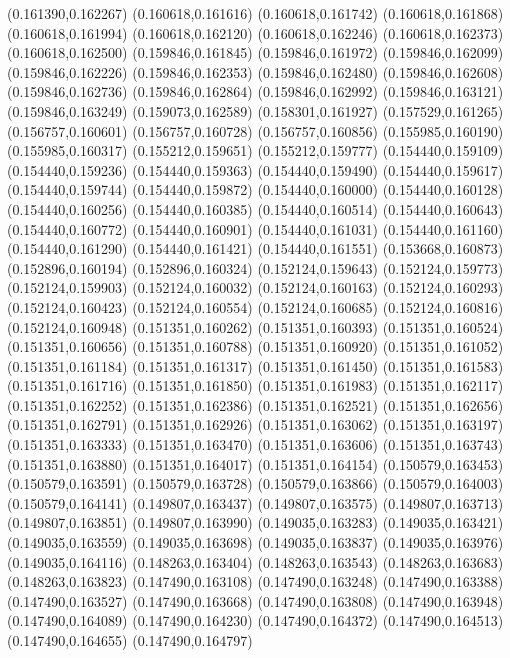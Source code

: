 (0.161390,0.162267)
(0.160618,0.161616)
(0.160618,0.161742)
(0.160618,0.161868)
(0.160618,0.161994)
(0.160618,0.162120)
(0.160618,0.162246)
(0.160618,0.162373)
(0.160618,0.162500)
(0.159846,0.161845)
(0.159846,0.161972)
(0.159846,0.162099)
(0.159846,0.162226)
(0.159846,0.162353)
(0.159846,0.162480)
(0.159846,0.162608)
(0.159846,0.162736)
(0.159846,0.162864)
(0.159846,0.162992)
(0.159846,0.163121)
(0.159846,0.163249)
(0.159073,0.162589)
(0.158301,0.161927)
(0.157529,0.161265)
(0.156757,0.160601)
(0.156757,0.160728)
(0.156757,0.160856)
(0.155985,0.160190)
(0.155985,0.160317)
(0.155212,0.159651)
(0.155212,0.159777)
(0.154440,0.159109)
(0.154440,0.159236)
(0.154440,0.159363)
(0.154440,0.159490)
(0.154440,0.159617)
(0.154440,0.159744)
(0.154440,0.159872)
(0.154440,0.160000)
(0.154440,0.160128)
(0.154440,0.160256)
(0.154440,0.160385)
(0.154440,0.160514)
(0.154440,0.160643)
(0.154440,0.160772)
(0.154440,0.160901)
(0.154440,0.161031)
(0.154440,0.161160)
(0.154440,0.161290)
(0.154440,0.161421)
(0.154440,0.161551)
(0.153668,0.160873)
(0.152896,0.160194)
(0.152896,0.160324)
(0.152124,0.159643)
(0.152124,0.159773)
(0.152124,0.159903)
(0.152124,0.160032)
(0.152124,0.160163)
(0.152124,0.160293)
(0.152124,0.160423)
(0.152124,0.160554)
(0.152124,0.160685)
(0.152124,0.160816)
(0.152124,0.160948)
(0.151351,0.160262)
(0.151351,0.160393)
(0.151351,0.160524)
(0.151351,0.160656)
(0.151351,0.160788)
(0.151351,0.160920)
(0.151351,0.161052)
(0.151351,0.161184)
(0.151351,0.161317)
(0.151351,0.161450)
(0.151351,0.161583)
(0.151351,0.161716)
(0.151351,0.161850)
(0.151351,0.161983)
(0.151351,0.162117)
(0.151351,0.162252)
(0.151351,0.162386)
(0.151351,0.162521)
(0.151351,0.162656)
(0.151351,0.162791)
(0.151351,0.162926)
(0.151351,0.163062)
(0.151351,0.163197)
(0.151351,0.163333)
(0.151351,0.163470)
(0.151351,0.163606)
(0.151351,0.163743)
(0.151351,0.163880)
(0.151351,0.164017)
(0.151351,0.164154)
(0.150579,0.163453)
(0.150579,0.163591)
(0.150579,0.163728)
(0.150579,0.163866)
(0.150579,0.164003)
(0.150579,0.164141)
(0.149807,0.163437)
(0.149807,0.163575)
(0.149807,0.163713)
(0.149807,0.163851)
(0.149807,0.163990)
(0.149035,0.163283)
(0.149035,0.163421)
(0.149035,0.163559)
(0.149035,0.163698)
(0.149035,0.163837)
(0.149035,0.163976)
(0.149035,0.164116)
(0.148263,0.163404)
(0.148263,0.163543)
(0.148263,0.163683)
(0.148263,0.163823)
(0.147490,0.163108)
(0.147490,0.163248)
(0.147490,0.163388)
(0.147490,0.163527)
(0.147490,0.163668)
(0.147490,0.163808)
(0.147490,0.163948)
(0.147490,0.164089)
(0.147490,0.164230)
(0.147490,0.164372)
(0.147490,0.164513)
(0.147490,0.164655)
(0.147490,0.164797)
